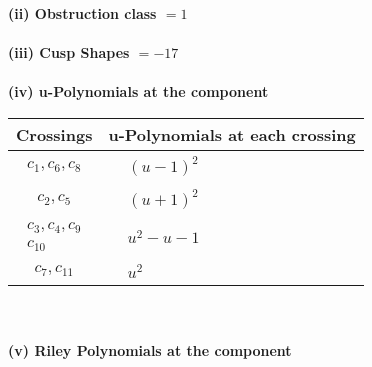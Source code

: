 \documentclass[1p]{elsarticle_modified}
\theoremstyle{definition}
\begin{document}
\flushleft \textbf{(ii) Obstruction class $= 1$}\\~\\
\flushleft \textbf{(iii) Cusp Shapes $= -17$}\\~\\
\newpage\renewcommand{\arraystretch}{1}
\flushleft \textbf{(iv) u-Polynomials at the component}\newline \\
\begin{tabular}{m{50pt}|m{274pt}}
Crossings & \hspace{64pt}u-Polynomials at each crossing \\
\hline $$\begin{aligned}c_{1},c_{6},c_{8}\end{aligned}$$&$\begin{aligned}
&(u-1)^2
\end{aligned}$\\
\hline $$\begin{aligned}c_{2},c_{5}\end{aligned}$$&$\begin{aligned}
&(u+1)^2
\end{aligned}$\\
\hline $$\begin{aligned}c_{3},c_{4},c_{9}\\c_{10}\end{aligned}$$&$\begin{aligned}
&u^2- u-1
\end{aligned}$\\
\hline $$\begin{aligned}c_{7},c_{11}\end{aligned}$$&$\begin{aligned}
&u^2
\end{aligned}$\\
\hline
\end{tabular}\\~\\
\newpage\renewcommand{\arraystretch}{1}
\flushleft \textbf{(v) Riley Polynomials at the component}\newline \\
\end{document}
